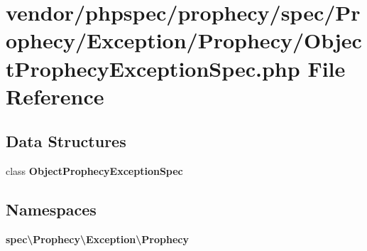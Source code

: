 \section{vendor/phpspec/prophecy/spec/\+Prophecy/\+Exception/\+Prophecy/\+Object\+Prophecy\+Exception\+Spec.php File Reference}
\label{_object_prophecy_exception_spec_8php}
\subsection*{Data Structures}
\begin{DoxyCompactItemize}
\item 
class {\bf Object\+Prophecy\+Exception\+Spec}
\end{DoxyCompactItemize}
\subsection*{Namespaces}
\begin{DoxyCompactItemize}
\item 
 {\bf spec\textbackslash{}\+Prophecy\textbackslash{}\+Exception\textbackslash{}\+Prophecy}
\end{DoxyCompactItemize}
